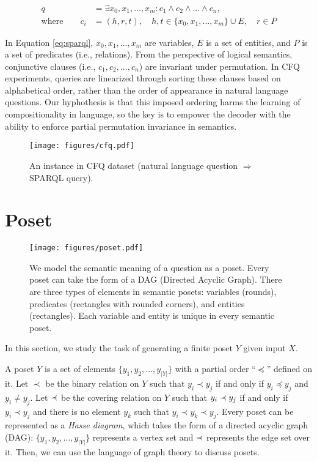 \documentclass{article}
\newcommand{\precdot}{\prec\mathrel{\mkern-5mu}\mathrel{\cdot}}
\begin{document}
\begin{equation}
\begin{split}
q & = \exists x_0, x_1, ..., x_m: c_1 \wedge c_2 \wedge ... \wedge c_n,\\
\text{where}\qquad c_i & = (h, r, t),\quad h,t\in \{x_0, x_1, ..., x_m\}\cup E,\quad r\in P
\end{split}
\label{eq:sparql}
\end{equation}

In Equation \ref{eq:sparql}, $x_0, x_1, ..., x_m$ are variables, $E$ is a set of entities, and $P$ is a set of predicates (i.e., relations).
From the perspective of logical semantics, conjunctive clauses (i.e., $c_1, c_2, ..., c_n$) are invariant under permutation.
In CFQ experiments, queries are linearized through sorting these clauses based on alphabetical order, rather than the order of appearance in natural language questions.
Our hyphothesis is that this imposed ordering harms the learning of compositionality in language, so the key is to empower the decoder with the ability to enforce partial permutation invariance in semantics.



\begin{figure}
\small
\centering
\texttt{[image: figures/cfq.pdf]}
\caption{An instance in CFQ dataset (natural language question $\Rightarrow$ SPARQL query).}
\label{fig:cfq}
\end{figure}

\section{Poset}

\begin{figure}
\small
\centering
\texttt{[image: figures/poset.pdf]}
\caption{We model the semantic meaning of a question as a poset.
Every poset can take the form of a DAG (Directed Acyclic Graph).
There are three types of elements in semantic posets: variables (rounds), predicates (rectangles with rounded corners), and entities (rectangles).
Each variable and entity is unique in every semantic poset.}
\label{fig:poset}
\end{figure}

In this section, we study the task of generating a finite poset $Y$ given input $X$.

A poset $Y$ is a set of elements $\{y_1, y_2, ..., y_{|Y|}\}$ with a partial order ``$\preceq$'' defined on it.
Let $\prec$ be the binary relation on $Y$ such that $y_i\prec y_j$ if and only if $y_i \preceq y_j$ and $y_i \neq y_j$.
Let $\precdot$ be the covering relation on $Y$ such that $y_i\precdot y_j$ if and only if $y_i\prec y_j$ and there is no element $y_k$ such that $y_i\prec y_k\prec y_j$.
Every poset can be represented as a \emph{Hasse diagram}, which takes the form of a directed acyclic graph (DAG):
$\{y_1, y_2, ..., y_{|Y|}\}$ represents a vertex set and $\precdot$ represents the edge set over it.
Then, we can use the language of graph theory to discuss posets.
\end{document}
